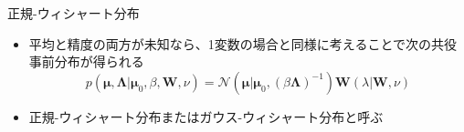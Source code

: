 \begin{frame}{正規-ウィシャート分布}
 \begin{itemize}
  \item \alert{平均と精度の両方が未知}なら、1変数の場合と同様に考えることで次の共役事前分布が得られる
        \begin{equation}
         p(\bm{\mu},\bm{\Lambda}|\bm{\mu}_0,\beta,\bm{W},\nu) = \mathcal{N}(\bm{\mu}|\bm{\mu}_0,(\beta\bm{\Lambda})^{-1})\bm{W}(\lambda|\bm{W},\nu)
        \end{equation}
  \item \alert{正規-ウィシャート分布}または\alert{ガウス-ウィシャート分布}と呼ぶ
 \end{itemize}
\end{frame}
